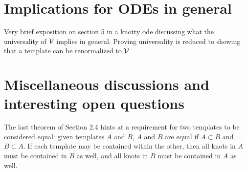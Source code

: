 \documentclass[paper.tex]{subfiles}
\begin{document}
\section{Implications for ODEs in general}

Very brief exposition on section 5 in a knotty ode discussing what the universality of $\mathcal{V}$ implies in general. Proving universality is reduced to showing that a template can be renormalized to $\mathcal{V}$


\section{Miscellaneous discussions and interesting open questions}


The last theorem of Section 2.4 hints at a requirement for two templates to be considered equal: given templates $A$ and $B$, $A$ and $B$ are equal if $A \subset B$ and $B \subset A$. If each template may be contained within the other, then all knots in $A$ must be contained in $B$ as well, and all knots in $B$ must be contained in $A$ as well. 
\end{document}
